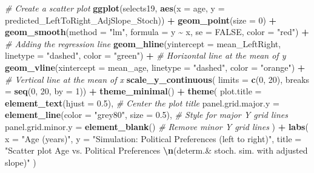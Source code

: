 \documentclass[
]{book}
\newenvironment{Shaded}{\begin{snugshade}}{\end{snugshade}}
\newcommand{\AttributeTok}[1]{\textcolor[rgb]{0.13,0.29,0.53}{#1}}
\newcommand{\CommentTok}[1]{\textcolor[rgb]{0.56,0.35,0.01}{\textit{#1}}}
\newcommand{\ConstantTok}[1]{\textcolor[rgb]{0.56,0.35,0.01}{#1}}
\newcommand{\DecValTok}[1]{\textcolor[rgb]{0.00,0.00,0.81}{#1}}
\newcommand{\FloatTok}[1]{\textcolor[rgb]{0.00,0.00,0.81}{#1}}
\newcommand{\FunctionTok}[1]{\textcolor[rgb]{0.13,0.29,0.53}{\textbf{#1}}}
\newcommand{\NormalTok}[1]{#1}
\newcommand{\SpecialCharTok}[1]{\textcolor[rgb]{0.81,0.36,0.00}{\textbf{#1}}}
\newcommand{\StringTok}[1]{\textcolor[rgb]{0.31,0.60,0.02}{#1}}
\begin{document}
\begin{Shaded}
\begin{Highlighting}[]
\CommentTok{\# Create a scatter plot}
\FunctionTok{ggplot}\NormalTok{(selects19, }\FunctionTok{aes}\NormalTok{(}\AttributeTok{x =}\NormalTok{ age, }\AttributeTok{y =}\NormalTok{ predicted\_LeftToRight\_AdjSlope\_Stoch)) }\SpecialCharTok{+}
  \FunctionTok{geom\_point}\NormalTok{(}\AttributeTok{size =} \DecValTok{0}\NormalTok{) }\SpecialCharTok{+}
  \FunctionTok{geom\_smooth}\NormalTok{(}\AttributeTok{method =} \StringTok{"lm"}\NormalTok{, }\AttributeTok{formula =}\NormalTok{ y }\SpecialCharTok{\textasciitilde{}}\NormalTok{ x, }\AttributeTok{se =} \ConstantTok{FALSE}\NormalTok{, }\AttributeTok{color =} \StringTok{"red"}\NormalTok{) }\SpecialCharTok{+}  \CommentTok{\# Adding the regression line}
  \FunctionTok{geom\_hline}\NormalTok{(}\AttributeTok{yintercept =}\NormalTok{ mean\_LeftRight, }\AttributeTok{linetype =} \StringTok{"dashed"}\NormalTok{, }\AttributeTok{color =} \StringTok{"green"}\NormalTok{) }\SpecialCharTok{+}  \CommentTok{\# Horizontal line at the mean of y}
  \FunctionTok{geom\_vline}\NormalTok{(}\AttributeTok{xintercept =}\NormalTok{ mean\_age, }\AttributeTok{linetype =} \StringTok{"dashed"}\NormalTok{, }\AttributeTok{color =} \StringTok{"orange"}\NormalTok{) }\SpecialCharTok{+}  \CommentTok{\# Vertical line at the mean of x}
  \FunctionTok{scale\_y\_continuous}\NormalTok{(}
    \AttributeTok{limits =} \FunctionTok{c}\NormalTok{(}\DecValTok{0}\NormalTok{, }\DecValTok{20}\NormalTok{),}
    \AttributeTok{breaks =} \FunctionTok{seq}\NormalTok{(}\DecValTok{0}\NormalTok{, }\DecValTok{20}\NormalTok{, }\AttributeTok{by =} \DecValTok{1}\NormalTok{)) }\SpecialCharTok{+}
  \FunctionTok{theme\_minimal}\NormalTok{() }\SpecialCharTok{+}
  \FunctionTok{theme}\NormalTok{(}
    \AttributeTok{plot.title =} \FunctionTok{element\_text}\NormalTok{(}\AttributeTok{hjust =} \FloatTok{0.5}\NormalTok{), }\CommentTok{\# Center the plot title}
    \AttributeTok{panel.grid.major.y =} \FunctionTok{element\_line}\NormalTok{(}\AttributeTok{color =} \StringTok{"grey80"}\NormalTok{, }\AttributeTok{size =} \FloatTok{0.5}\NormalTok{), }\CommentTok{\# Style for major Y grid lines}
    \AttributeTok{panel.grid.minor.y =} \FunctionTok{element\_blank}\NormalTok{() }\CommentTok{\# Remove minor Y grid lines}
\NormalTok{  ) }\SpecialCharTok{+}
  \FunctionTok{labs}\NormalTok{(}
    \AttributeTok{x =} \StringTok{"Age (years)"}\NormalTok{,}
    \AttributeTok{y =} \StringTok{"Simulation: Political Preferences (left to right)"}\NormalTok{,}
    \AttributeTok{title =} \StringTok{"Scatter plot Age vs. Political Preferences }\SpecialCharTok{\textbackslash{}n}\StringTok{(determ.\& stoch. sim. with adjusted slope)"}
\NormalTok{  )}
\end{Highlighting}
\end{Shaded}
\end{document}
